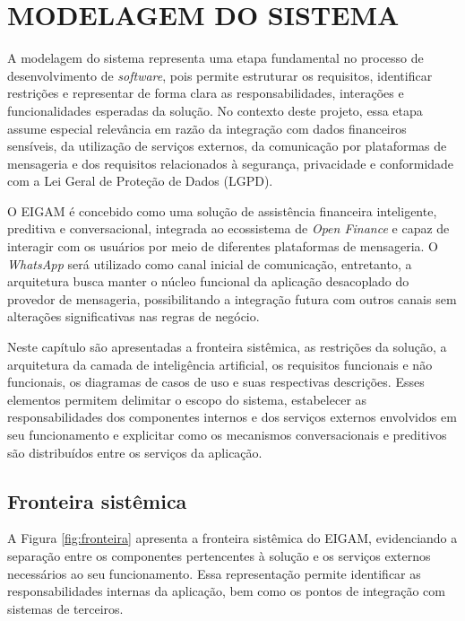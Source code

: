 \chapter{MODELAGEM DO SISTEMA}

A modelagem do sistema representa uma etapa fundamental no processo de desenvolvimento de \textit{software}, pois permite estruturar os requisitos, identificar restrições e representar de forma clara as responsabilidades, interações e funcionalidades esperadas da solução. No contexto deste projeto, essa etapa assume especial relevância em razão da integração com dados financeiros sensíveis, da utilização de serviços externos, da comunicação por plataformas de mensageria e dos requisitos relacionados à segurança, privacidade e conformidade com a Lei Geral de Proteção de Dados (LGPD).

O EIGAM é concebido como uma solução de assistência financeira inteligente, preditiva e conversacional, integrada ao ecossistema de \textit{Open Finance} e capaz de interagir com os usuários por meio de diferentes plataformas de mensageria. O \textit{WhatsApp} será utilizado como canal inicial de comunicação, entretanto, a arquitetura busca manter o núcleo funcional da aplicação desacoplado do provedor de mensageria, possibilitando a integração futura com outros canais sem alterações significativas nas regras de negócio.

Neste capítulo são apresentadas a fronteira sistêmica, as restrições da solução, a arquitetura da camada de inteligência artificial, os requisitos funcionais e não funcionais, os diagramas de casos de uso e suas respectivas descrições. Esses elementos permitem delimitar o escopo do sistema, estabelecer as responsabilidades dos componentes internos e dos serviços externos envolvidos em seu funcionamento e explicitar como os mecanismos conversacionais e preditivos são distribuídos entre os serviços da aplicação.


\section{Fronteira sistêmica}

A Figura \ref{fig:fronteira} apresenta a fronteira sistêmica do EIGAM, evidenciando a separação entre os componentes pertencentes à solução e os serviços externos necessários ao seu funcionamento. Essa representação permite identificar as responsabilidades internas da aplicação, bem como os pontos de integração com sistemas de terceiros.

